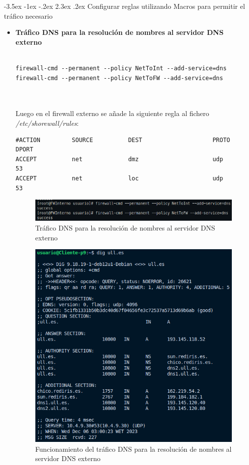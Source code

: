 \documentclass[11pt]{report}
\makeatletter
\renewcommand\chapter{\@startsection{chapter}{0}{\z@}%
    {-3.5ex \@plus -1ex \@minus -.2ex}%
    {2.3ex \@plus.2ex}%
    {\normalfont\Large\bfseries}}
\makeatother
\begin{document}
\chapter{Configurar reglas utilizando Macros para permitir el tráfico necesario}
\begin{itemize}
  \item \textbf{Tráfico DNS para la resolución de nombres al servidor DNS externo} 
  \\ \\
  \begin{BVerbatim}
firewall-cmd --permanent --policy NetToInt --add-service=dns
firewall-cmd --permanent --policy NetToFW --add-service=dns
  \end{BVerbatim} 
  \\ \\
  Luego en el firewall externo se añade la siguiente regla al fichero \emph{/etc/shorewall/rules}:
  \begin{verbatim}
#ACTION         SOURCE          DEST                    PROTO           DPORT
ACCEPT          net             dmz                     udp             53
ACCEPT          net             loc                     udp             53
  \end{verbatim}

  \begin{figure}[H]
    \centering
    \includegraphics[scale=0.75]{img/dns.png}
    \caption{Tráfico DNS para la resolución de nombres al servidor DNS externo}
  \end{figure}

  \begin{figure}[H]
    \centering
    \includegraphics[scale=0.65]{img/dns_ull.png}
    \caption{Funcionamiento del tráfico DNS para la resolución de nombres al servidor DNS externo}
  \end{figure}


\end{itemize}
\end{document}
